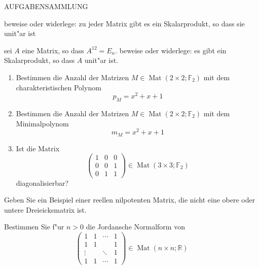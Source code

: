 \documentclass[a4paper]{article}
\begin{document}
\vspace{5mm}

\begin{center}
\end{center}

\newpage

AUFGABENSAMMLUNG

\begin{klaufg}{8}{}
beweise oder widerlege: zu jeder Matrix gibt es ein Skalarprodukt, so dass sie unit"ar ist
\end{klaufg}

\begin{klaufg}{8}{}
sei $A$ eine Matrix, so dass $A^{12} = E_n$. beweise oder widerlege: es gibt ein Skalarprodukt, so dass $A$ unit"ar ist.
\end{klaufg}

\begin{klaufg}{8}{}
\begin{enumerate}
\item
Bestimmen die Anzahl der Matrizen $M \in \operatorname{Mat}(2\times 2; \mathbb{F}_2)$ mit dem charakteristischen Polynom 
\[
p_M = x^2 + x + 1
\]
\item
Bestimmen die Anzahl der Matrizen $M \in \operatorname{Mat}(2\times 2; \mathbb{F}_2)$ mit dem Minimalpolynom 
\[
m_M = x^2 + x + 1
\]
\item
Ist die Matrix
\[
\begin{pmatrix}
1 & 0 & 0\\
0 & 0 & 1\\
0 & 1 & 1
\end{pmatrix} \in \operatorname{Mat}(3\times 3; \mathbb{F}_2)
\]
diagonalisierbar?
\end{enumerate}
\end{klaufg}

\begin{klaufg}{8}{}
Geben Sie ein Beispiel einer reellen nilpotenten Matrix, die nicht eine obere oder untere Dreieicksmatrix ist.
\end{klaufg}

\begin{klaufg}{8}{}
Bestimmen Sie f"ur $n > 0$ die Jordansche Normalform von
\[
\begin{pmatrix}
1 & 1 & \cdots & 1\\
1 & 1 &  & 1\\
\vdots & & \ddots & 1 \\
1 & 1&  \cdots & 1
\end{pmatrix} \in \operatorname{Mat}(n \times n; \mathbb{R})
\]
\end{klaufg}
\end{document}

